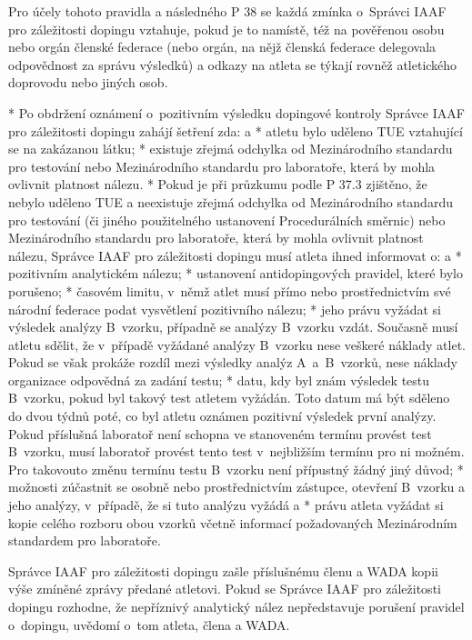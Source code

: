 Pro účely tohoto pravidla a následného P 38 se každá zmínka o~Správci IAAF pro záležitosti dopingu vztahuje, pokud je to namístě, též na pověřenou osobu nebo orgán členské federace (nebo orgán, na nějž členská federace delegovala odpovědnost za správu výsledků) a odkazy na atleta se týkají rovněž atletického doprovodu nebo jiných osob.

* Po obdržení oznámení o~pozitivním výsledku dopingové kontroly Správce IAAF pro záležitosti dopingu zahájí šetření zda:
  \begitems \style a
  * atletu bylo uděleno TUE vztahující se na zakázanou látku;
  * existuje zřejmá odchylka od Mezinárodního standardu pro testování nebo Mezinárodního standardu pro laboratoře, která by mohla ovlivnit platnost nálezu.
  \enditems
* Pokud je při průzkumu podle P 37.3 zjištěno, že nebylo uděleno TUE a neexistuje zřejmá odchylka od Mezinárodního standardu pro testování (či jiného použitelného ustanovení Procedurálních směrnic) nebo Mezinárodního standardu pro laboratoře, která by mohla ovlivnit platnost nálezu, Správce IAAF pro záležitosti dopingu musí atleta ihned informovat o:
  \begitems \style a
  * pozitivním analytickém nálezu;
  * ustanovení antidopingových pravidel, které bylo porušeno;
  * časovém limitu, v~němž atlet musí přímo nebo prostřednictvím své národní federace podat vysvětlení pozitivního nálezu;
  * jeho právu vyžádat si výsledek analýzy B~vzorku, případně se analýzy B~vzorku vzdát. Současně musí atletu sdělit, že v~případě vyžádané analýzy B~vzorku nese veškeré náklady atlet. Pokud se však prokáže rozdíl mezi výsledky analýz A~a~B~vzorků, nese náklady organizace odpovědná za zadání testu;
  * datu, kdy byl znám výsledek testu B~vzorku, pokud byl takový test atletem vyžádán. Toto datum má být sděleno do dvou týdnů poté, co byl atletu oznámen pozitivní výsledek první analýzy. Pokud příslušná laboratoř není schopna ve stanoveném termínu provést test B~vzorku, musí laboratoř provést tento test v~nejbližším termínu pro ni možném. Pro takovouto změnu termínu testu B~vzorku není přípustný žádný jiný důvod;
  * možnosti zúčastnit se osobně nebo prostřednictvím zástupce, otevření B~vzorku a jeho analýzy, v~případě, že si tuto analýzu vyžádá a
  * právu atleta vyžádat si kopie celého rozboru obou vzorků včetně informací požadovaných Mezinárodním standardem pro laboratoře.
  \enditems

Správce IAAF pro záležitosti dopingu zašle příslušnému členu a WADA kopii výše zmíněné zprávy předané atletovi. Pokud se Správce IAAF pro záležitosti dopingu rozhodne, že nepříznivý analytický nález nepředstavuje porušení pravidel o~dopingu, uvědomí o~tom atleta, člena a WADA.

